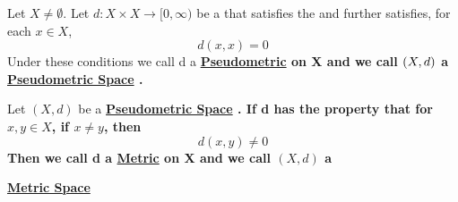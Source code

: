 \label{def:pseudometric}
\newcommand{\Pseudometric}[0]{
    \bf \hyperref[def:pseudometric]{Pseudometric} \rm
}
\newcommand{\PseudometricSpace}[0]{
    \bf \hyperref[def:pseudometric]{Pseudometric Space} \rm
}

\begin{df}[Pseudometric]
    Let $X \neq \emptyset$. 
    Let $d:X \times X \to [0,\infty)$ be a \SymmetricMap that satisfies the \TriangleInequality and further satisfies, for each $x \in X$, 
    \begin{equation}
        d(x,x) = 0
    \end{equation}
    Under these conditions we call d a \Pseudometric on X and we call $\left( X,d\right)$ a \PseudometricSpace.
    \end{df} 
	
	
	
\label{def:metric}
\newcommand{\Metric}[0]{
    \bf \hyperref[def:pseudometric]{Metric} \rm
}
\newcommand{\MetricSpace}[0]{
    \bf \hyperref[def:pseudometric]{Metric Space} \rm
}

\begin{df}[Metric]
	Let $(X,d)$ be a \PseudometricSpace. 
	If d has the property that for
	$x,y \in X$, if $x \neq y$, then
	\begin{equation*}
		d(x,y) \neq 0
	\end{equation*}
	Then we call d a \Metric on X 
	and we call $(X,d)$ a
	\MetricSpace
\end{df}